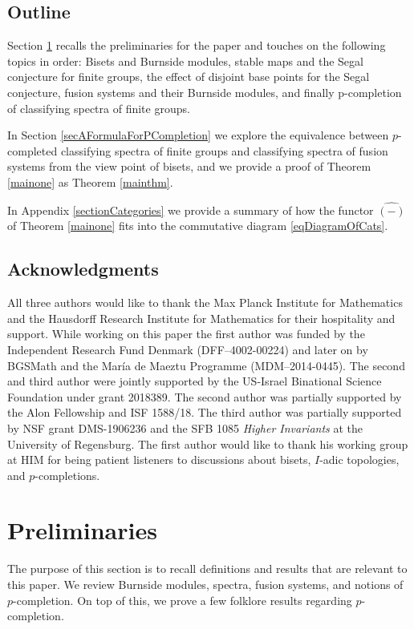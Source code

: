 \documentclass[10pt]{amsart}
\theoremstyle{definition}
\begin{document}
\subsection*{Outline}
Section \ref{secPreliminaries} recalls the preliminaries for the paper and touches on the following topics in order: Bisets and Burnside modules, stable maps and the Segal conjecture for finite groups, the effect of disjoint base points for the Segal conjecture, fusion systems and their Burnside modules, and finally p-completion of classifying spectra of finite groups.

In Section \ref{secAFormulaForPCompletion} we explore the equivalence between $p$-completed classifying spectra of finite groups and classifying spectra of fusion systems from the view point of bisets, and we provide a proof of Theorem \ref{mainone} as Theorem \ref{mainthm}.

In Appendix \ref{sectionCategories} we provide a summary of how the functor $\widehat{(-)}$ of Theorem \ref{mainone} fits into the commutative diagram \eqref{eqDiagramOfCats}.

\subsection*{Acknowledgments}
All three authors would like to thank the Max Planck Institute for Mathematics and the Hausdorff Research Institute for Mathematics for their hospitality and support. While working on this paper the first author was funded by the Independent Research Fund Denmark (DFF–4002-00224) and later on by BGSMath and the María de Maeztu Programme (MDM–2014-0445). The second and third author were jointly supported by the US-Israel Binational Science Foundation under grant 2018389. The second author was partially supported by the Alon Fellowship and ISF 1588/18. The third author was partially supported by NSF grant DMS-1906236 and the SFB 1085 \emph{Higher Invariants} at the University of Regensburg. The first author would like to thank his working group at HIM for being patient listeners to discussions about bisets, $I$-adic topologies, and $p$-completions. 



\section{Preliminaries}\label{secPreliminaries}
The purpose of this section is to recall definitions and results that are relevant to this paper. We review Burnside modules, spectra, fusion systems, and notions of $p$-completion. On top of this, we prove a few folklore results regarding $p$-completion.
\end{document}
